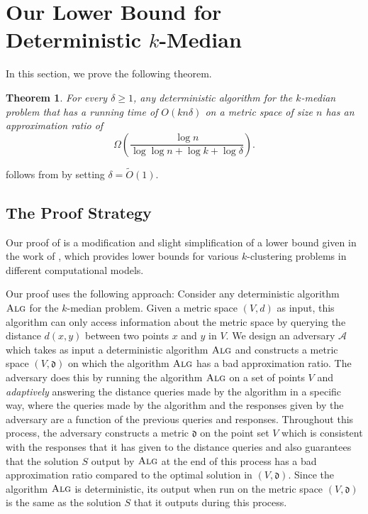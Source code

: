 \documentclass[11pt]{article}
\newcommand{\1}{\mathmybb{1}}
\newtheorem{theorem}{Theorem}[section]
\newcommand{\A}{\textsc{Alg}}
\newcommand{\adv}[0]{\mathcal{A}}
\begin{document}
\section{Our Lower Bound for Deterministic $k$-Median}\label{sec:lower}

In this section, we prove the following theorem.

\begin{theorem}\label{thm:lower bound}
    For every $\delta \geq 1$, any deterministic algorithm for the $k$-median problem that has a running time of $O(kn\delta)$ on a metric space of size $n$ has an approximation ratio of
    $$ \Omega \! \left( \frac{\log n}{\log\log n + \log k + \log \delta} \right). $$
\end{theorem}
 follows from  by setting $\delta = \tilde O(1)$.

\subsection{The Proof Strategy}

Our proof of  is a modification and slight simplification of a lower bound given in the work of \cite{BateniEFHJMW23}, which provides lower bounds for various $k$-clustering problems in different computational models. 

Our proof uses the following approach:
Consider any deterministic algorithm $\A$ for the $k$-median problem. Given a metric space $(V,d)$ as input,
this algorithm can only access information about the metric space by querying the distance $d(x,y)$ between two points $x$ and $y$ in $V$. We design an adversary $\adv$ which takes as input a deterministic algorithm $\A$ and constructs a metric space $(V, \mathfrak d)$ on which the algorithm $\A$ has a bad approximation ratio. The adversary does this by running the algorithm $\A$ on a set of points $V$ and \emph{adaptively} answering the distance queries made by the algorithm in a specific way, where the queries made by the algorithm and the responses given by the adversary are a function of the previous queries and responses.
Throughout this process, the adversary constructs a metric $\mathfrak d$ on the point set $V$ which is consistent with the responses that it has given to the distance queries and also guarantees that the solution $S$ output by $\A$ at the end of this process has a bad approximation ratio compared to the optimal solution in $(V, \mathfrak d)$. Since the algorithm $\A$ is deterministic, its output when run on the metric space $(V, \mathfrak d)$ is the same as the solution $S$ that it outputs during this process.
\end{document}

